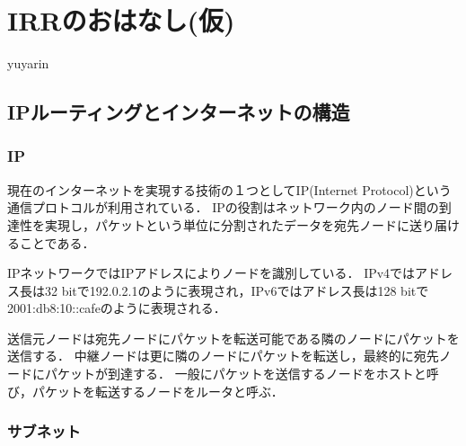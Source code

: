 

\chapter{IRRのおはなし(仮)}

\begin{flushright}
 {\headfont yuyarin} %
\end{flushright}

%

\section{IPルーティングとインターネットの構造}


\subsection{IP}

現在のインターネットを実現する技術の１つとしてIP(Internet Protocol)という通信プロトコルが利用されている．
IPの役割はネットワーク内のノード間の到達性を実現し，パケットという単位に分割されたデータを宛先ノードに送り届けることである．

IPネットワークではIPアドレスによりノードを識別している．
IPv4ではアドレス長は32 bitで192.0.2.1のように表現され，IPv6ではアドレス長は128 bitで2001:db8:10::cafeのように表現される．

送信元ノードは宛先ノードにパケットを転送可能である隣のノードにパケットを送信する．
中継ノードは更に隣のノードにパケットを転送し，最終的に宛先ノードにパケットが到達する．
一般にパケットを送信するノードをホストと呼び，パケットを転送するノードをルータと呼ぶ．

\subsection{サブネット}

